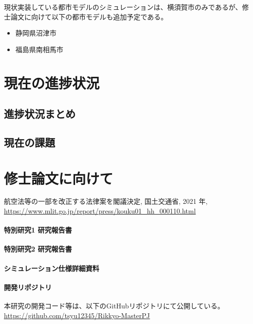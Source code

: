 \documentclass{article}[jsarticle]
\begin{document}
現状実装している都市モデルのシミュレーションは、横須賀市のみであるが、修士論文に向けて以下の都市モデルも追加予定である。
\begin{itemize}
    \item 静岡県沼津市
    \item 福島県南相馬市
\end{itemize}


\section{現在の進捗状況}
\subsection{進捗状況まとめ}

\subsection{現在の課題}

\section{修士論文に向けて}

\begin{thebibliography}{9}
     航空法等の一部を改正する法律案を閣議決定, 国土交通省, 2021 年, \url{https://www.mlit.go.jp/report/press/kouku01_hh_000110.html}
\end{thebibliography}

\begin{appendix}
    \paragraph{特別研究1 研究報告書} \par
    \url{}

    \paragraph{特別研究2 研究報告書} \par
    \url{}

    \paragraph{シミュレーション仕様詳細資料} \par 
    \url{}

    \paragraph{開発リポジトリ} \par
    本研究の開発コード等は、以下のGitHubリポジトリにて公開している。
    \url{https://github.com/tsyu12345/Rikkyo-MasterPJ}

\end{appendix}
\end{document}
